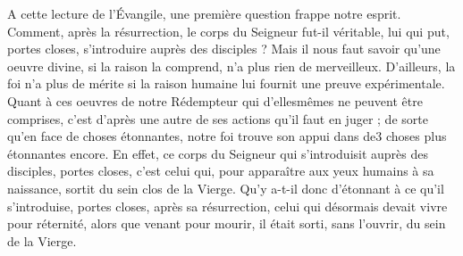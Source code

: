 A cette lecture de l'Évangile, une première question frappe notre esprit. Comment, après la résurrection, le corps du Seigneur fut-il véritable, lui qui put, portes closes, s’introduire auprès des disciples ? Mais il nous faut savoir qu’une oeuvre divine, si la raison la comprend, n’a plus rien de merveilleux. D’ailleurs, la foi n’a plus de mérite si la raison humaine lui fournit une preuve expérimentale. Quant à ces oeuvres de notre Rédempteur qui d’ellesmêmes ne peuvent être comprises, c’est d’après une autre de ses actions qu’il faut en juger ; de sorte qu’en face de choses étonnantes, notre foi trouve son appui dans de3 choses plus étonnantes encore. En effet, ce corps du Seigneur qui s’introduisit auprès des disciples, portes closes, c’est celui qui, pour apparaître aux yeux humains à sa naissance, sortit du sein clos de la Vierge. Qu’y a-t-il donc d’étonnant à ce qu’il s’introduise, portes closes, après sa résurrection, celui qui désormais devait vivre pour réternité, alors que venant pour mourir, il était sorti, sans l’ouvrir, du sein de la Vierge.
